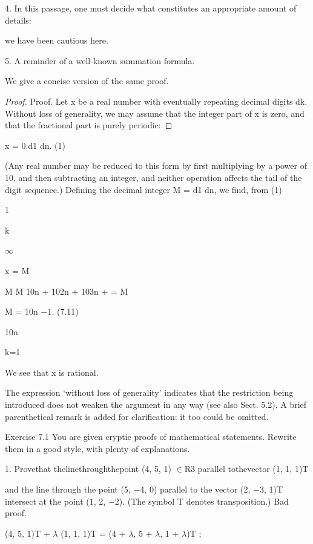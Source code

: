 \documentclass[11pt]{article}
\theoremstyle{plain}
\theoremstyle{definition}
\begin{document}
4. In this passage, one must decide what constitutes an appropriate amount of details:

we have been cautious here.

5. A reminder of a well-known summation formula.

We give a concise version of the same proof.

\begin{proof}
Proof. Let x be a real number with eventually repeating decimal digits dk. Without loss of generality, we may assume that the integer part of x is zero, and that the fractional part is purely periodic:
\end{proof}

x = 0.d1 \textperiodcentered{} \textperiodcentered{} \textperiodcentered{} dn. (1)

(Any real number may be reduced to this form by first multiplying by a power of 10, and then subtracting an integer, and neither operation affects the tail of the digit sequence.) Defining the decimal integer M = d1 \textperiodcentered{} \textperiodcentered{} \textperiodcentered{} dn, we find, from (1)

1

k

$\infty$

x = M

M M 10n + 102n + 103n + \textperiodcentered{} \textperiodcentered{} \textperiodcentered{} = M

M = 10n $-$1. (7.11)

10n

k=1

We see that x is rational. 

The expression `without loss of generality' indicates that the restriction being introduced does not weaken the argument in any way (see also Sect. 5.2). A brief parenthetical remark is added for clarification: it too could be omitted.

Exercise 7.1 You are given cryptic proofs of mathematical statements. Rewrite them in a good style, with plenty of explanations.

1. Provethat thelinethroughthepoint (4, 5, 1) $\in$R3 parallel tothevector (1, 1, 1)T

and the line through the point (5, $-$4, 0) parallel to the vector (2, $-$3, 1)T intersect at the point (1, 2, $-$2). (The symbol T denotes transposition.) Bad proof.

(4, 5, 1)T + $\lambda$ (1, 1, 1)T = (4 + $\lambda$, 5 + $\lambda$, 1 + $\lambda$)T ;
\end{document}
